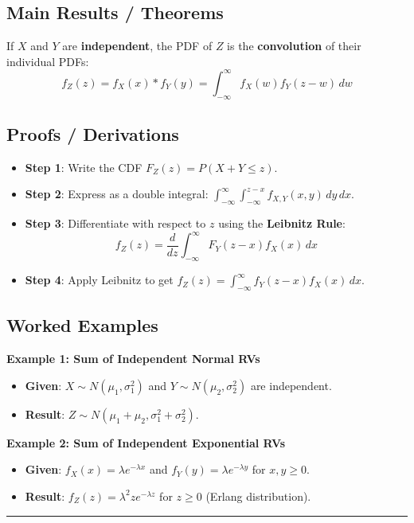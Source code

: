 \documentclass[11pt]{article}
\begin{document}
\subsection{Main Results / Theorems}
If $X$ and $Y$ are \textbf{independent}, the PDF of $Z$ is the \textbf{convolution} of their individual PDFs:
\[ f_Z(z) = f_X(x) * f_Y(y) = \int_{-\infty}^{\infty} f_X(w) f_Y(z-w) \, dw \]

\subsection{Proofs / Derivations}
\begin{itemize}
    \item \textbf{Step 1}: Write the CDF $F_Z(z) = P(X+Y \leq z)$.
    \item \textbf{Step 2}: Express as a double integral: $\int_{-\infty}^{\infty} \int_{-\infty}^{z-x} f_{X,Y}(x,y) \, dy \, dx$.
    \item \textbf{Step 3}: Differentiate with respect to $z$ using the \textbf{Leibnitz Rule}:
    \[ f_Z(z) = \frac{d}{dz} \int_{-\infty}^{\infty} F_Y(z-x) f_X(x) \, dx \]
    \item \textbf{Step 4}: Apply Leibnitz to get $f_Z(z) = \int_{-\infty}^{\infty} f_Y(z-x) f_X(x) \, dx$.
\end{itemize}

\subsection{Worked Examples}
\textbf{Example 1: Sum of Independent Normal RVs}
\begin{itemize}
    \item \textbf{Given}: $X \sim N(\mu_1, \sigma_1^2)$ and $Y \sim N(\mu_2, \sigma_2^2)$ are independent.
    \item \textbf{Result}: $Z \sim N(\mu_1 + \mu_2, \sigma_1^2 + \sigma_2^2)$.
\end{itemize}

\textbf{Example 2: Sum of Independent Exponential RVs}
\begin{itemize}
    \item \textbf{Given}: $f_X(x) = \lambda e^{-\lambda x}$ and $f_Y(y) = \lambda e^{-\lambda y}$ for $x,y \geq 0$.
    \item \textbf{Result}: $f_Z(z) = \lambda^2 z e^{-\lambda z}$ for $z \geq 0$ (Erlang distribution).
\end{itemize}

\hrule
\vspace{0.5cm}
\end{document}
